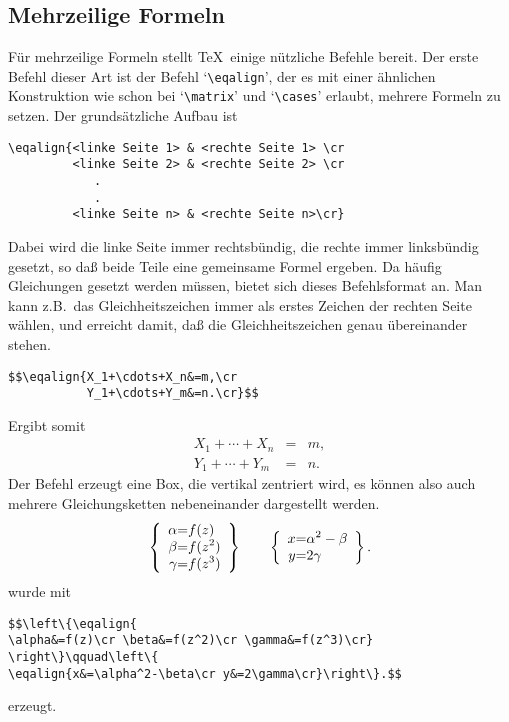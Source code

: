 \subsection{Mehrzeilige Formeln}
F\"ur mehrzeilige Formeln stellt \TeX\ einige n\"utzliche Befehle bereit.
Der erste Befehl dieser Art ist der Befehl
`\verb|\eqalign|', der es
mit einer \"ahnlichen Konstruktion wie schon bei
`\verb|\matrix|' und
`\verb|\cases|' erlaubt, mehrere Formeln zu setzen. Der
grunds\"atzliche Aufbau ist
\begin{verbatim}
\eqalign{<linke Seite 1> & <rechte Seite 1> \cr
         <linke Seite 2> & <rechte Seite 2> \cr
            .
            .
         <linke Seite n> & <rechte Seite n>\cr}
\end{verbatim}
Dabei wird die linke Seite immer 
rechtsb\"undig, die rechte immer
linksb\"undig gesetzt, so da\ss{} beide Teile eine gemeinsame Formel
ergeben. Da h\"aufig Gleichungen gesetzt werden m\"ussen, bietet sich
dieses Befehlsformat an. Man kann z.B.\ das 
Gleichheitszeichen immer
als erstes Zeichen der rechten Seite w\"ahlen, und erreicht damit, da\ss{}
die Gleichheitszeichen genau \"ubereinander stehen.
\begin{verbatim}
$$\eqalign{X_1+\cdots+X_n&=m,\cr
           Y_1+\cdots+Y_m&=n.\cr}$$
\end{verbatim}
Ergibt somit
\begin{eqnarray*}
X_1+\cdots+X_n & = & m,\\
Y_1+\cdots+Y_m & = & n.
\end{eqnarray*}
Der Befehl erzeugt eine Box, die vertikal
zentriert wird, es k\"onnen
also auch mehrere 
Gleichungsketten nebeneinander dargestellt werden.
$$
\left\{\begin{array}{r@{=}l}
\displaystyle{\alpha} & \displaystyle{f(z)}\\
\displaystyle{\beta} & \displaystyle{f(z^2)}\\
\displaystyle{\gamma} & \displaystyle{f(z^3)}\end{array}
\right\}\qquad\left\{
\begin{array}{r@{=}l}
\displaystyle{x} & \displaystyle{\alpha^2-\beta}\\
\displaystyle{y} & \displaystyle{2\gamma}\end{array}\right\}.$$
wurde mit
\begin{verbatim}
$$\left\{\eqalign{
\alpha&=f(z)\cr \beta&=f(z^2)\cr \gamma&=f(z^3)\cr}
\right\}\qquad\left\{
\eqalign{x&=\alpha^2-\beta\cr y&=2\gamma\cr}\right\}.$$
\end{verbatim}
erzeugt.

